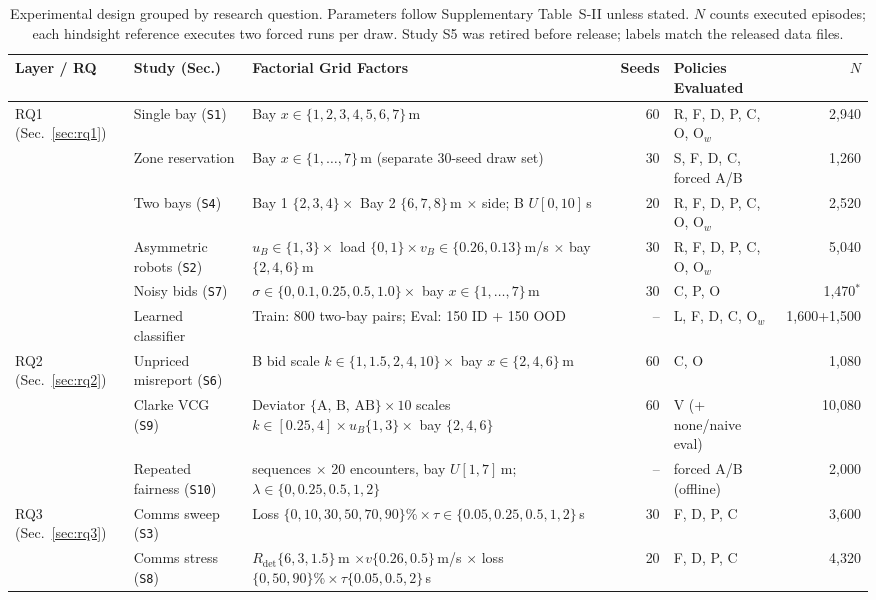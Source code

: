 \begin{table}[!t]\centering
\caption{Experimental design grouped by research question. Parameters follow Supplementary Table~S-II unless stated. $N$ counts executed episodes; each hindsight reference executes two forced runs per draw. Study S5 was retired before release; labels match the released data files.}
\label{tab:design}
{\footnotesize\setlength{\tabcolsep}{3.4pt}
\begin{tabular}{@{}ll>{\raggedright\arraybackslash}p{}rlr@{}}\toprule
Layer / RQ & Study (Sec.) & Factorial Grid Factors & Seeds & Policies Evaluated & $N$ \\\midrule
\multirow{6}{*}{RQ1 (Sec.~\ref{sec:rq1})}
 & Single bay (\texttt{S1}) & Bay $x\in\{1,2,3,4,5,6,7\}$\,m & 60 & R, F, D, P, C, O, O$_w$ & 2,940 \\
 & Zone reservation & Bay $x\in\{1,\dots,7\}$\,m (separate 30-seed draw set) & 30 & S, F, D, C, forced A/B & 1,260 \\
 & Two bays (\texttt{S4}) & Bay 1 $\{2,3,4\}\times$ Bay 2 $\{6,7,8\}$\,m $\times$ side; B $U[0,10]$\,s & 20 & R, F, D, P, C, O, O$_w$ & 2,520 \\
 & Asymmetric robots (\texttt{S2}) & $u_B\in\{1,3\}\times$ load $\{0,1\}\times v_B\in\{0.26,0.13\}$\,m/s $\times$ bay $\{2,4,6\}$\,m & 30 & R, F, D, P, C, O, O$_w$ & 5,040 \\
 & Noisy bids (\texttt{S7}) & $\sigma\in\{0,0.1,0.25,0.5,1.0\}\times$ bay $x\in\{1,\dots,7\}$\,m & 30 & C, P, O & 1,470$^\ast$ \\
 & Learned classifier & Train: 800 two-bay pairs; Eval: 150 ID + 150 OOD & -- & L, F, D, C, O$_w$ & 1,600+1,500 \\\midrule
\multirow{3}{*}{RQ2 (Sec.~\ref{sec:rq2})}
 & Unpriced misreport (\texttt{S6}) & B bid scale $k\in\{1,1.5,2,4,10\}\times$ bay $x\in\{2,4,6\}$\,m & 60 & C, O & 1,080 \\
 & Clarke VCG (\texttt{S9}) & Deviator $\{\text{A, B, AB}\}\times 10$ scales $k\in[0.25,4]\times u_B\{1,3\}\times$ bay $\{2,4,6\}$ & 60 & V (+ none/naive eval) & 10,080 \\
 & Repeated fairness (\texttt{S10}) & 50 sequences $\times$ 20 encounters, bay $U[1,7]$\,m; $\lambda\in\{0,0.25,0.5,1,2\}$ & -- & forced A/B (offline) & 2,000 \\\midrule
\multirow{7}{*}{RQ3 (Sec.~\ref{sec:rq3})}
 & Comms sweep (\texttt{S3}) & Loss $\{0,10,30,50,70,90\}\%\times\tau\in\{0.05,0.25,0.5,1,2\}$\,s & 30 & F, D, P, C & 3,600 \\
 & Comms stress (\texttt{S8}) & $R_{\mathrm{det}}\{6,3,1.5\}$\,m $\times v\{0.26,0.5\}$\,m/s $\times$ loss $\{0,50,90\}\%\times\tau\{0.05,0.5,2\}$\,s & 20 & F, D, P, C & 4,320 \\

\end{tabular}}
\end{table}
